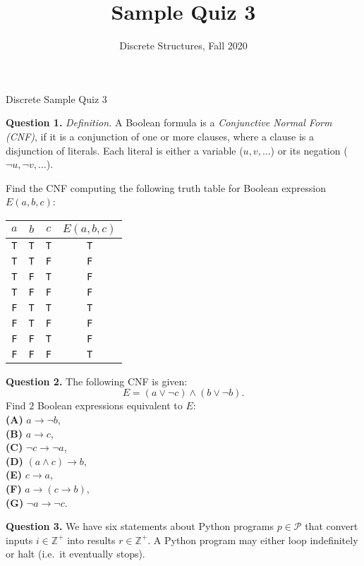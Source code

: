 \documentclass[jou]{apa6}
\title{Sample Quiz 3}
\author{Discrete Structures, Fall 2020}
\affiliation{RBS}
\begin{document}
\thispagestyle{empty}

\twocolumn
{\Large Discrete Sample Quiz 3}

\vspace{6pt}
{\bf Question 1.} {\em Definition.} A Boolean formula is a 
{\em Conjunctive Normal Form (CNF)}, 
if it is a conjunction of one or more clauses, 
where a clause is a disjunction of literals. Each literal 
is either a variable ($u,v,\ldots$) or its negation ($\neg u, \neg v, \ldots$). 

Find the CNF computing the following truth table for Boolean 
expression $E(a,b,c)$:\\
\begin{tabular}{ c | c | c | c }
$a$ & $b$ & $c$ & $E(a,b,c)$  \\ \hline
{\tt T} & {\tt T} & {\tt T} & {\tt T} \\ \hline
{\tt T} & {\tt T} & {\tt F} & {\tt F} \\ \hline
{\tt T} & {\tt F} & {\tt T} & {\tt F} \\ \hline
{\tt T} & {\tt F} & {\tt F} & {\tt F} \\ \hline
{\tt F} & {\tt T} & {\tt T} & {\tt T} \\ \hline
{\tt F} & {\tt T} & {\tt F} & {\tt F} \\ \hline
{\tt F} & {\tt F} & {\tt T} & {\tt F} \\ \hline
{\tt F} & {\tt F} & {\tt F} & {\tt T} \\ \hline
\end{tabular}




\vspace{6pt}
{\bf Question 2.} The following CNF is given:
$$E = (a \vee \neg c) \wedge (b \vee \neg b).$$
Find $2$ Boolean expressions equivalent to $E$:\\[3pt]
{\bf (A)} $a \rightarrow \neg b$,\\[3pt]
{\bf (B)} $a \rightarrow c$,\\[3pt]
{\bf (C)} $\neg c \rightarrow \neg a$,\\[3pt]
{\bf (D)} $(a \wedge c) \rightarrow b$,\\[3pt]
{\bf (E)} $c \rightarrow a$,\\[3pt]
{\bf (F)} $a \rightarrow (c \rightarrow b)$,\\[3pt]
{\bf (G)} $\neg a \rightarrow \neg c$.

\vspace{6pt}
{\bf Question 3.} We have six statements about Python programs $p \in \mathcal{P}$
that convert inputs $i \in \mathbb{Z}^{+}$ into results $r \in \mathbb{Z}^{+}$.  
A Python program may either loop indefinitely or halt (i.e.\ it eventually stops).
\end{document}
